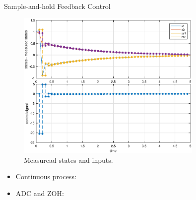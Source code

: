 \begin{example}{Sample-and-hold Feedback Control}
\begin{figure}%
  \begin{center}
    \includegraphics[width=0.8\textwidth]{figures/Simulink/ZOH_exampleResults.eps}
   \caption{Measuread states and inputs.}
\label{fig:ZOH_exampleResults}
  \end{center}
\end{figure}


\begin{itemize}
\item Continuous process:





\item ADC and ZOH:





\end{itemize}
\end{example}
